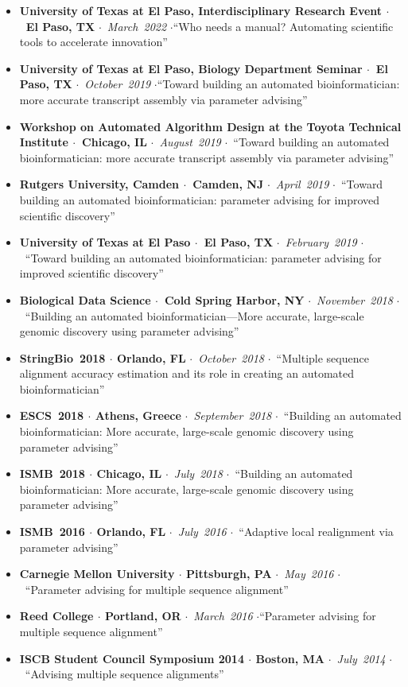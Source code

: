 \documentclass[10pt,letterpaper]{article}
\newcommand{\bigdot}{$\cdot$\xspace}
\begin{document}
\begin{itemize}[leftmargin=*,labelindent=5pt,itemindent=-15pt]
  \item \textbf{University of Texas at El Paso, Interdisciplinary Research Event \bigdot~El Paso, TX} \bigdot~\textit{March~2022} \bigdot ``Who needs a manual? Automating scientific tools to accelerate innovation''
  \item \textbf{University of Texas at El Paso, Biology Department Seminar \bigdot~El Paso, TX} \bigdot~\textit{October~2019} \bigdot ``Toward building an automated bioinformatician: more accurate transcript assembly via parameter advising''
  \item \textbf{Workshop on Automated Algorithm Design at the Toyota Technical Institute \bigdot~Chicago, IL} \bigdot~\textit{August~2019} \bigdot~``Toward building an automated bioinformatician: more accurate transcript assembly via parameter advising''
  \item \textbf{Rutgers University, Camden \bigdot~Camden, NJ} \bigdot~\textit{April~2019} \bigdot~``Toward building an automated bioinformatician: 
parameter advising for improved scientific discovery''
  \item \textbf{University of Texas at El Paso \bigdot~El Paso, TX} \bigdot~\textit{February~2019} \bigdot~``Toward building an automated bioinformatician: 
parameter advising for improved scientific discovery''
  \item \textbf{Biological Data Science \bigdot~Cold Spring Harbor, NY} \bigdot~\textit{November~2018} \bigdot~``Building an automated bioinformatician---More accurate, large-scale genomic discovery using parameter advising'' 
   \item \textbf{StringBio~2018 \bigdot Orlando, FL} \bigdot~\textit{October~2018} \bigdot~``Multiple sequence alignment accuracy estimation and its role in creating an automated bioinformatician'' 
   \item \textbf{ESCS~2018 \bigdot Athens, Greece} \bigdot~\textit{September~2018} \bigdot~``Building an automated bioinformatician: More accurate, large-scale genomic discovery using parameter advising''
    \item \textbf{ISMB~2018 \bigdot Chicago, IL} \bigdot~\textit{July~2018} \bigdot~``Building an automated bioinformatician: More accurate, large-scale genomic discovery using parameter advising''
    \item \textbf{ISMB~2016 \bigdot Orlando, FL} \bigdot~\textit{July~2016} \bigdot~``Adaptive local realignment via parameter advising'' 
    \item \textbf{Carnegie Mellon University \bigdot Pittsburgh, PA} \bigdot~\textit{May~2016} \bigdot~``Parameter advising for multiple sequence alignment''
    \item \textbf{Reed College \bigdot Portland, OR} \bigdot~\textit{March~2016} \bigdot ``Parameter advising for multiple sequence alignment''
    \item \textbf{ISCB Student Council Symposium 2014 \bigdot  Boston, MA} \bigdot~\textit{July~2014} \bigdot~``Advising multiple sequence alignments''
   
\end{itemize}
\end{document}
